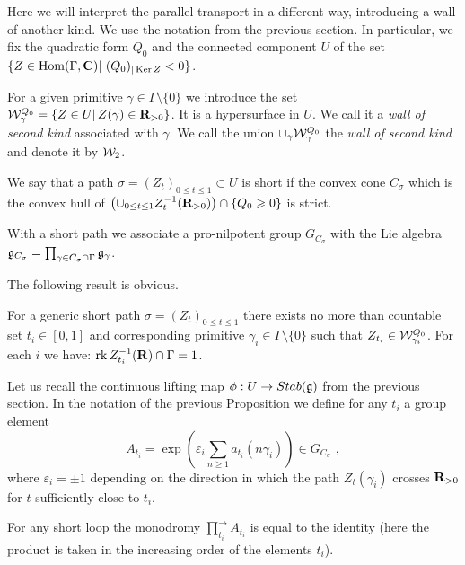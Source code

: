 \documentclass[12pt]{article}
\begin{document}
Here we will interpret the parallel transport in a different way, introducing a wall of another kind.
We use the notation from the previous section. In particular, we fix the quadratic form $Q_0$ and the connected component $U$ of the set $\{Z\in \operatorname{Hom}(\Gamma,{\bf C})|\,\, (Q_{0})_{|\operatorname{Ker} Z}<0\}$.

For a given primitive $\gamma\in \Gamma\setminus \{0\}$ we introduce the set ${\cal W}_{\gamma}^{Q_0}=\{Z\in U|\,Z(\gamma)\in {\bf R}_{>0}\}$. It is a hypersurface in $U$. We call it a {\it wall of second kind} associated with $\gamma$. We call the union $\cup_{\gamma}{\cal W}_{\gamma}^{Q_0}$ the {\it wall of second kind} and denote it by
${\cal W}_2$.





\begin{defn} We say that a path $\sigma=(Z_t)_{0\le t\le 1}\subset U$ is short if the convex cone
$C_{\sigma}$ which is the convex hull of $\left(\cup_{0\le t\le 1}Z_t^{-1}({\bf R}_{>0})\right)\cap \{Q_0\geqslant 0\}$
is strict.


\end{defn}

With a short path we  associate a pro-nilpotent group $G_{C_{\sigma}}$ with the Lie algebra
${\mathfrak g}_{C_{\sigma}}=\prod_{\gamma\in C_{\sigma}\cap \Gamma}{\mathfrak g}_{\gamma}$.


The following result is obvious.
\begin{prp} For a generic short path $\sigma=(Z_t)_{0\le t\le 1}$ there exists no more than countable
set $t_i\in [0,1]$ and corresponding primitive $\gamma_i\in \Gamma\setminus \{0\}$ such that $Z_{t_i}\in {\cal W}_{\gamma_i}^{Q_0}$. For each $i$ we have: $\operatorname{rk} Z_{t_i}^{-1}({\bf R})\cap \Gamma=1$.

\end{prp}

Let us recall the continuous lifting map $\phi: U\to Stab({\mathfrak g})$ from the previous section. In the notation of the previous Proposition we define for any $t_i$ a group element
$$A_{t_i}=\exp\left(\varepsilon_i\sum_{n\geqslant 1}a_{t_i}({n\gamma_i})\right)\in G_{C_{\sigma}}\,\,,$$
where $\varepsilon_i=\pm 1$ depending on the direction in which the path $Z_t(\gamma_i)$ crosses ${\bf R}_{>0}$ for $t$ sufficiently close to $t_i$.

\begin{thm} For any short loop the monodromy $\prod_{t_i}^{\longrightarrow}A_{t_i}$ is equal to the identity
(here the product is taken in the increasing order of the elements $t_i$).


\end{thm}
\end{document}
